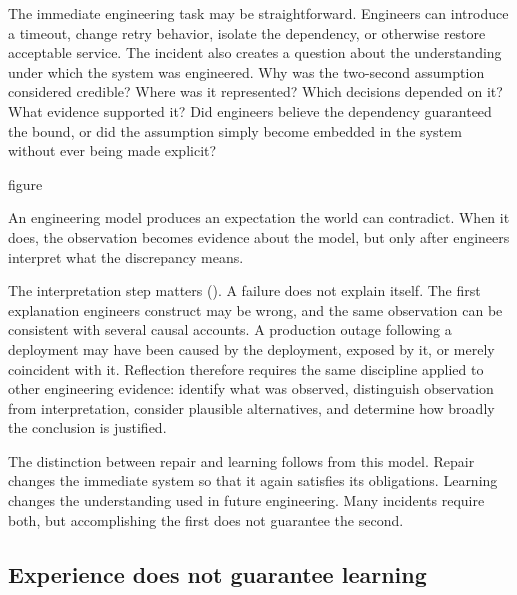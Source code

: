 The immediate engineering task may be straightforward. Engineers can introduce a timeout, change
retry behavior, isolate the dependency, or otherwise restore acceptable service. The incident also
creates a question about the understanding under which the system was engineered. Why was the
two-second assumption considered credible? Where was it represented? Which decisions depended on
it? What evidence supported it? Did engineers believe the dependency guaranteed the bound, or did
the assumption simply become embedded in the system without ever being made explicit?

\begin{bookbox}{figure}{} %
\pandocbounded{}

An engineering model produces an expectation the world can contradict. When it does, the
observation becomes evidence about the model, but only after engineers interpret what the
discrepancy means.
\end{bookbox}

The interpretation step matters (\citet{fig-expectation-observation}). A failure does not explain itself. The first explanation engineers
construct may be wrong, and the same observation can be consistent with several causal accounts. A
production outage following a deployment may have been caused by the deployment, exposed by it, or
merely coincident with it. Reflection therefore requires the same discipline applied to other
engineering evidence: identify what was observed, distinguish observation from interpretation,
consider plausible alternatives, and determine how broadly the conclusion is justified.

The distinction between repair and learning follows from this model. Repair changes the immediate
system so that it again satisfies its obligations. Learning changes the understanding used in
future engineering. Many incidents require both, but accomplishing the first does not guarantee the
second.

\subsection{Experience does not guarantee learning}\label{sec-experience-not-learning}


